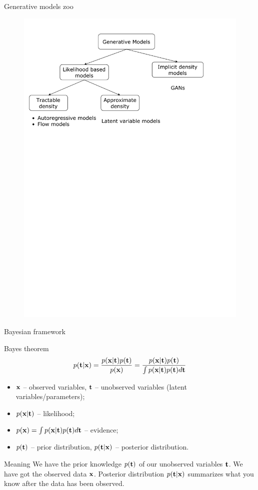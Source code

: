 \begin{frame}{Generative models zoo}
    \begin{figure}
        \centering
        \includegraphics[width=1.0\linewidth]{figs/generative_models_zoo.pdf}
        \label{fig:generative_models_zoo}
    \end{figure}
\end{frame}
\begin{frame}{Bayesian framework}
	\begin{block}{Bayes theorem}
		\[
			p(\mathbf{t} | \mathbf{x}) = \frac{p(\mathbf{x} | \mathbf{t}) p(\mathbf{t})}{p(\mathbf{x})} = \frac{p(\mathbf{x} | \mathbf{t}) p(\mathbf{t})}{\int p(\mathbf{x} | \mathbf{t}) p(\mathbf{t}) d \mathbf{t}} 
		\]
		\begin{itemize}
			\item $\mathbf{x}$ -- observed variables, $\mathbf{t}$ -- unobserved variables (latent variables/parameters);
			\item $p(\mathbf{x} | \mathbf{t})$ -- likelihood;
			\item $p(\mathbf{x}) = \int p(\mathbf{x} | \mathbf{t}) p(\mathbf{t}) d \mathbf{t}$ -- evidence;
			\item $p(\mathbf{t})$ -- prior distribution, $p(\mathbf{t} | \mathbf{x})$ -- posterior distribution.
		\end{itemize}
	\end{block}
	\begin{block}{Meaning}
		We have the prior knowledge $p(\mathbf{t})$ of our unobserved variables $\mathbf{t}$. We have got the observed data $\mathbf{x}$. 
		Posterior distribution $p(\mathbf{t} | \mathbf{x})$ summarizes what you know after the data has been observed.
	\end{block}
\end{frame}
